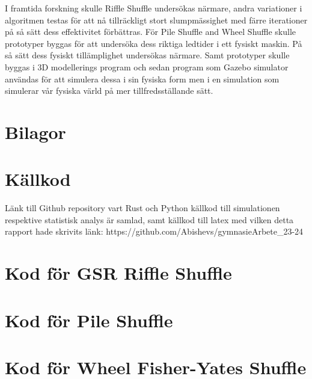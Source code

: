 \documentclass[swedish,a4paper]{article}
\renewcommand{\appendixpagename}{Bilagor}
\begin{document}
I framtida forskning skulle Riffle Shuffle undersökas närmare, andra variationer i
algoritmen testas för att nå tillräckligt stort slumpmässighet med färre
iterationer på så sätt dess effektivitet förbättras. För Pile Shuffle and Wheel
Shuffle skulle prototyper byggas för att undersöka dess riktiga ledtider i ett
fysiskt maskin. På så sätt dess fysiskt tillämplighet undersökas närmare. Samt
prototyper skulle byggas i 3D modellerings program och sedan program som Gazebo simulator användas för att simulera dessa i sin fysiska form men i
en simulation som simulerar vår fysiska värld på mer tillfredsställande sätt.



\printbibliography[heading=bibintoc, title={Bibliografi}]

\appendix
\section*{\appendixpagename} 
\addcontentsline{toc}{section}{\appendixpagename} 

\section{Källkod}
\label{app:github}
Länk till Github repository vart Rust och Python källkod till simulationen 
respektive statistisk analys är samlad, samt källkod till latex med
vilken detta rapport hade skrivits
länk: https://github.com/Abishevs/gymnasieArbete_23-24

\section{Kod för GSR Riffle Shuffle}
\label{app:gsr}

%

\section{Kod för Pile Shuffle}
\label{app:pile}


\section{Kod för Wheel Fisher-Yates Shuffle}
\label{app:wheel}

\end{document}
